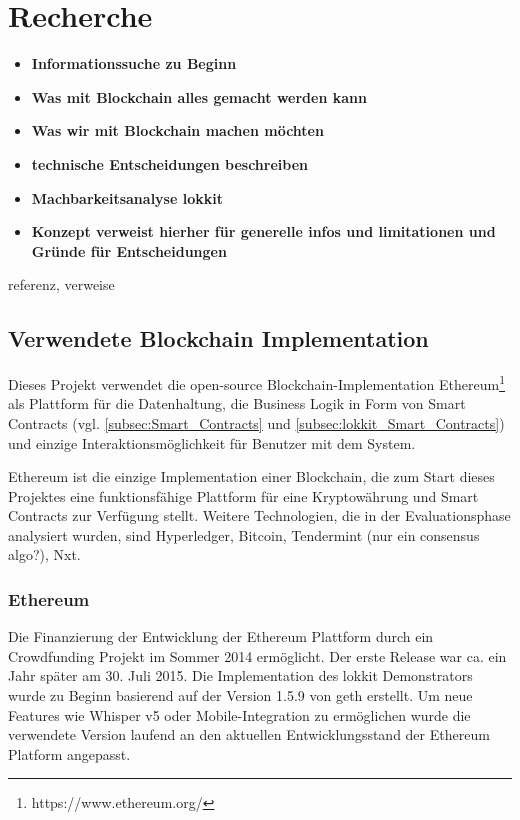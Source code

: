 \section{Recherche}
\label{sec:Blockchain}
\begin{itemize}
    \item \textbf{Informationssuche zu Beginn}
    \item \textbf{Was mit Blockchain alles gemacht werden kann}
    \item \textbf{Was wir mit Blockchain machen möchten}
    \item \textbf{technische Entscheidungen beschreiben}
    \item \textbf{Machbarkeitsanalyse lokkit}
    \item \textbf{Konzept verweist hierher für generelle infos und limitationen und Gründe für Entscheidungen}
\end{itemize}

referenz, verweise

\subsection{Verwendete Blockchain Implementation}
Dieses Projekt verwendet die open-source Blockchain-Implementation Ethereum\footnote{https://www.ethereum.org/} als Plattform für die Datenhaltung, die Business Logik in Form von Smart Contracts (vgl. \ref{subsec:Smart_Contracts} und \ref{subsec:lokkit_Smart_Contracts}) und einzige Interaktionsmöglichkeit für Benutzer mit dem System.

Ethereum ist die einzige Implementation einer Blockchain, die zum Start dieses Projektes eine funktionsfähige Plattform für eine Kryptowährung und Smart Contracts zur Verfügung stellt. Weitere Technologien, die in der Evaluationsphase analysiert wurden, sind Hyperledger, Bitcoin, Tendermint (nur ein consensus algo?), Nxt.

\subsubsection{Ethereum}
Die Finanzierung der Entwicklung der Ethereum Plattform durch ein Crowdfunding Projekt im Sommer 2014 ermöglicht. Der erste Release war ca. ein Jahr später am 30. Juli 2015. Die Implementation des lokkit Demonstrators wurde zu Beginn basierend auf der Version 1.5.9 von geth erstellt. Um neue Features wie Whisper v5 oder Mobile-Integration zu ermöglichen wurde die verwendete Version laufend an den aktuellen Entwicklungsstand der Ethereum Platform angepasst.
